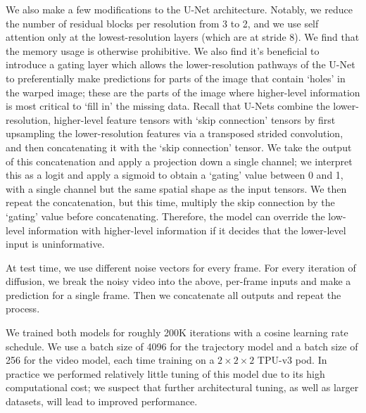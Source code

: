 \documentclass[10pt,twocolumn,letterpaper]{article}
\begin{document}
We also make a few modifications to the U-Net architecture.  Notably, we reduce the number of residual blocks per resolution from 3 to 2, and we use self attention only at the lowest-resolution layers (which are at stride 8).  We find that the memory usage is otherwise prohibitive.  We also find it's beneficial to introduce a gating layer which allows the lower-resolution pathways of the U-Net to preferentially make predictions for parts of the image that contain `holes' in the warped image; these are the parts of the image where higher-level information is most critical to `fill in' the missing data.  Recall that U-Nets combine the lower-resolution, higher-level feature tensors with `skip connection' tensors by first upsampling the lower-resolution features via a transposed strided convolution, and then concatenating it with the `skip connection' tensor.  We take the output of this concatenation and apply a projection down a single channel; we interpret this as a logit and apply a sigmoid to obtain a `gating' value between 0 and 1, with a single channel but the same spatial shape as the input tensors.  We then repeat the concatenation, but this time, multiply the skip connection by the `gating' value before concatenating.  Therefore, the model can override the low-level information with higher-level information if it decides that the lower-level input is uninformative.  

At test time, we use different noise vectors for every frame.  For every iteration of diffusion, we break the noisy video into the above, per-frame inputs and make a prediction for a single frame.  Then we concatenate all outputs and repeat the process.

We trained both models for roughly 200K iterations with a cosine learning rate schedule.  We use a batch size of 4096 for the trajectory model and a batch size of 256 for the video model, each time training on a $2\times 2 \times 2$ TPU-v3 pod.  In practice we performed relatively little tuning of this model due to its high computational cost; we suspect that further architectural tuning, as well as larger datasets, will lead to improved performance.
\end{document}
